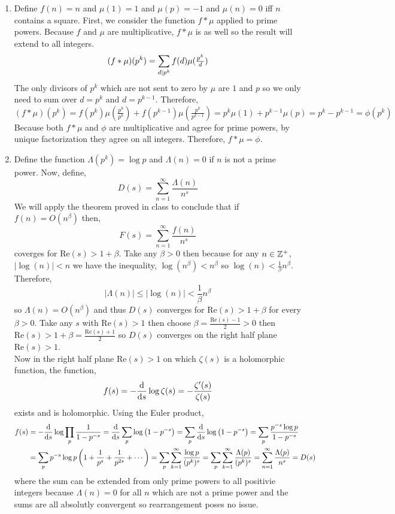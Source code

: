 \documentclass[12pt]{extarticle}
\begin{document}
\begin{enumerate}
\begin{enumerate}
\item Define $f(n) = n$ and $\mu(1) = 1$ and $\mu(p) = -1$ and $\mu(n) = 0$ iff $n$ contains a square. First, we consider the function $f * \mu$ applied to prime powers. Because $f$ and $\mu$ are multiplicative, $f * \mu$ is as well so the result will extend to all integers. 
\[ (f * \mu)(p^k) = \sum_{d \mid p^k} f(d) \mu(\tfrac{p^k}{d})\]
The only divisors of $p^k$ which are not sent to zero by $\mu$ are $1$ and $p$ so we only need to sum over $d = p^k$ and $d = p^{k-1}$. Therefore, 
\[ (f * \mu)(p^k) = f(p^k)  \mu(\tfrac{p^k}{p^k}) + f(p^{k-1})  \mu(\tfrac{p^k}{p^{k-1}}) = p^k \mu(1) + p^{k-1} \mu(p) = p^k - p^{k-1} = \phi(p^k) \]
Because both $f * \mu$ and $\phi$ are multiplicative and agree for prime powers, by unique factorization they agree on all integers. Therefore, $f * \mu = \phi$. 

\item Define the function $\Lambda(p^k) = \log{p}$ and $\Lambda(n) = 0$ if $n$ is not a prime power. Now, define,
\[ D(s) = \sum_{n = 1}^\infty \frac{\Lambda(n)}{n^s}\]  
We will apply the theorem proved in class to conclude that if $f(n) = O(n^\beta)$ then,
\[ F(s) = \sum_{n = 1}^\infty \frac{f(n)}{n^s}\] coverges for $\mathrm{Re}(s) > 1 + \beta$. Take any $\beta > 0$ then because for any $n \in \mathbb{Z}^{+}$, $|\log(n)| < n$ we have the inequality, $\log(n^\beta) < n^\beta$ so $\log(n) < \frac{1}{\beta} n^\beta$. Therefore, 
\[ |\Lambda(n)| \le |\log(n)| < \frac{1}{\beta} n^\beta\]
so $\Lambda(n) = O(n^\beta)$ and thus $D(s)$ converges for $\mathrm{Re}(s) > 1 + \beta$ for every $\beta > 0$. Take any $s$ with $\mathrm{Re}(s) > 1$ then choose $\beta = \frac{\mathrm{Re}(s) - 1}{2} > 0$ then $\mathrm{Re}(s) > 1 + \beta = \frac{\mathrm{Re}(s) + 1}{2}$ so $D(s)$ converges on the right half plane $\mathrm{Re}(s) > 1$. \bigskip \\
Now in the right half plane $\mathrm{Re}(s) > 1$ on which $\zeta(s)$ is a holomorphic function, the function,
\[ f(s) = - \frac{\mathrm{d}}{\mathrm{d}s} \log{\zeta(s)} = - \frac{\zeta'(s)}{\zeta(s)} \]   
exists and is holomorphic. Using the Euler product,
\begin{align*}
f(s) &= - \frac{\mathrm{d}}{\mathrm{d}s} \log{ \prod_{p} \frac{1}{1 - p^{-s}}} = \frac{\mathrm{d}}{\mathrm{d}s} \sum_{p} \log{\left(1 - p^{-s}\right)} = \sum_{p} \frac{\mathrm{d}}{\mathrm{d}s} \log{\left(1 - p^{-s}\right)} = \sum_{p} \frac{p^{-s} \log{p}}{1 - p^{-s}} \\ & = \sum_{p} p^{-s} \log{p} \left(1 + \frac{1}{p^s} + \frac{1}{p^{2s}} + \cdots \right) = \sum_{p} \sum_{k = 1}^{\infty} \frac{\log{p}}{(p^k)^s} = \sum_{p} \sum_{k = 1}^{\infty} \frac{\Lambda(p)}{(p^k)^s} = \sum_{n = 1}^{\infty} \frac{\Lambda(p)}{n^s} = D(s)
\end{align*}  
where the sum can be extended from only prime powers to all positivie integers because $\Lambda(n) = 0$ for all $n$ which are not a prime power and the sums are all absolutly convergent so rearrangement poses no issue. 

\end{enumerate}

\end{enumerate}
\end{document}
